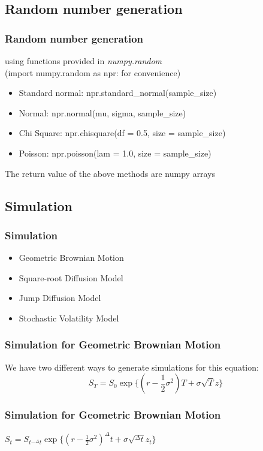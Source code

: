 \documentclass{beamer}
\begin{document}
\subsection{Random number generation}
\begin{frame}
\frametitle{Random number generation}
using functions provided in \emph{numpy.random}\\
(import numpy.random as npr: for convenience)
\begin{itemize}
	\item Standard normal: npr.standard\_normal(sample\_size)
	\item Normal: npr.normal(mu, sigma, sample\_size)
	\item Chi Square: npr.chisquare(df = 0.5, size = sample\_size)
	\item Poisson: npr.poisson(lam = 1.0, size = sample\_size)
\end{itemize}
The return value of the above methods are numpy arrays
\end{frame}

\subsection{Simulation}
\begin{frame}
\frametitle{Simulation}
\begin{itemize}
	\item Geometric Brownian Motion
	\item Square-root Diffusion Model
	\item Jump Diffusion Model
	\item Stochastic Volatility Model
\end{itemize}
\end{frame}

\begin{frame}
\frametitle{Simulation for Geometric Brownian Motion}
\begin{center}
We have two different ways to generate simulations for this equation:\\
$$S_{T} = S_{0}\exp\{(r-\frac{1}{2}\sigma^{2})T + \sigma\sqrt{T}z\}$$
\end{center}
\end{frame}

\begin{frame}
\frametitle{Simulation for Geometric Brownian Motion}
\begin{center}
$S_{t} = S_{t-^{\Delta}t}\exp\{(r-\frac{1}{2}\sigma^{2})^{\Delta}t + \sigma\sqrt{^{\Delta}t}z_{t}\}$
\end{center}
\end{frame}
\end{document}
